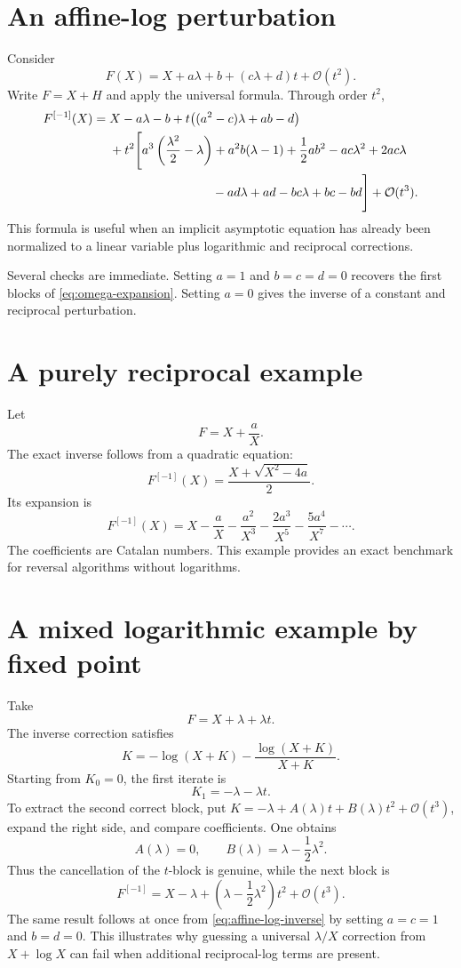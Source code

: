 \documentclass[11pt,openany]{book}
\theoremstyle{definition}
\theoremstyle{plain}
\theoremstyle{remark}
\newcommand{\bigO}{\mathcal{O}}
\newcommand{\invcomp}{^{[-1]}}
\begin{document}
\section{An affine-log perturbation}
Consider
\begin{equation}\label{eq:affine-log-F}
 F(X)=X+a\lambda+b+(c\lambda+d)t+\bigO(t^2).
\end{equation}
Write \(F=X+H\) and apply the universal formula. Through order \(t^2\),
\begin{align}
 F\invcomp(X)={}&X-a\lambda-b
 +t\bigl((a^2-c)\lambda+ab-d\bigr)\notag\\
 &+t^2\Bigg[
 a^3\left(\frac{\lambda^2}{2}-\lambda\right)
 +a^2b(\lambda-1)+\frac12ab^2
 -ac\lambda^2+2ac\lambda\notag\\
 &\hspace{2.9cm}-ad\lambda+ad-bc\lambda+bc-bd
 \Bigg]
 +\bigO(t^3).
\label{eq:affine-log-inverse}
\end{align}
This formula is useful when an implicit asymptotic equation has already been normalized to a linear variable plus logarithmic and reciprocal corrections.

Several checks are immediate. Setting \(a=1\) and \(b=c=d=0\) recovers the first blocks of \cref{eq:omega-expansion}. Setting \(a=0\) gives the inverse of a constant and reciprocal perturbation.

\section{A purely reciprocal example}
Let
\[
 F=X+\frac{a}{X}.
\]
The exact inverse follows from a quadratic equation:
\[
 F\invcomp(X)=\frac{X+\sqrt{X^2-4a}}2.
\]
Its expansion is
\begin{equation}\label{eq:catalan-inverse}
 F\invcomp(X)
 =X-\frac aX-\frac{a^2}{X^3}-\frac{2a^3}{X^5}
 -\frac{5a^4}{X^7}-\cdots.
\end{equation}
The coefficients are Catalan numbers. This example provides an exact benchmark for reversal algorithms without logarithms.

\section{A mixed logarithmic example by fixed point}
Take
\[
 F=X+\lambda+\lambda t.
\]
The inverse correction satisfies
\[
 K=-\log(X+K)-\frac{\log(X+K)}{X+K}.
\]
Starting from \(K_0=0\), the first iterate is
\[
 K_1=-\lambda-\lambda t.
\]
To extract the second correct block, put \(K=-\lambda+A(\lambda)t+B(\lambda)t^2+\bigO(t^3)\), expand the right side, and compare coefficients. One obtains
\[
 A(\lambda)=0,
 \qquad
 B(\lambda)=\lambda-\frac12\lambda^2.
\]
Thus the cancellation of the \(t\)-block is genuine, while the next block is
\[
 F\invcomp
 =X-\lambda+\left(\lambda-\frac12\lambda^2\right)t^2+\bigO(t^3).
\]
The same result follows at once from \cref{eq:affine-log-inverse} by setting \(a=c=1\) and \(b=d=0\). This illustrates why guessing a universal \(\lambda/X\) correction from \(X+\log X\) can fail when additional reciprocal-log terms are present.
\end{document}
